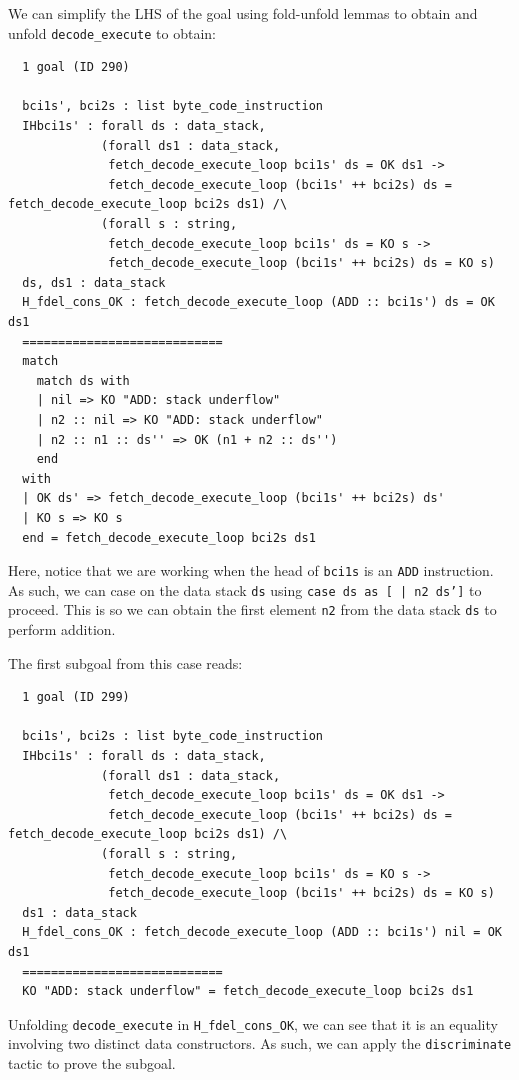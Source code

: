 \documentclass{article}
\begin{document}
We can simplify the LHS of the goal using fold-unfold lemmas to obtain and unfold \texttt{decode\_execute} to obtain:

\begin{lstlisting}
  1 goal (ID 290)
  
  bci1s', bci2s : list byte_code_instruction
  IHbci1s' : forall ds : data_stack,
             (forall ds1 : data_stack,
              fetch_decode_execute_loop bci1s' ds = OK ds1 ->
              fetch_decode_execute_loop (bci1s' ++ bci2s) ds = fetch_decode_execute_loop bci2s ds1) /\
             (forall s : string,
              fetch_decode_execute_loop bci1s' ds = KO s ->
              fetch_decode_execute_loop (bci1s' ++ bci2s) ds = KO s)
  ds, ds1 : data_stack
  H_fdel_cons_OK : fetch_decode_execute_loop (ADD :: bci1s') ds = OK ds1
  ============================
  match
    match ds with
    | nil => KO "ADD: stack underflow"
    | n2 :: nil => KO "ADD: stack underflow"
    | n2 :: n1 :: ds'' => OK (n1 + n2 :: ds'')
    end
  with
  | OK ds' => fetch_decode_execute_loop (bci1s' ++ bci2s) ds'
  | KO s => KO s
  end = fetch_decode_execute_loop bci2s ds1
\end{lstlisting}

Here, notice that we are working when the head of \texttt{bci1s} is an \texttt{ADD} instruction. As such, we can case on the data stack \texttt{ds} using \texttt{case ds as [ | n2 ds']} to proceed. This is so we can obtain the first element \texttt{n2} from the data stack \texttt{ds} to perform addition.

The first subgoal from this case reads:

\begin{lstlisting}
  1 goal (ID 299)
  
  bci1s', bci2s : list byte_code_instruction
  IHbci1s' : forall ds : data_stack,
             (forall ds1 : data_stack,
              fetch_decode_execute_loop bci1s' ds = OK ds1 ->
              fetch_decode_execute_loop (bci1s' ++ bci2s) ds = fetch_decode_execute_loop bci2s ds1) /\
             (forall s : string,
              fetch_decode_execute_loop bci1s' ds = KO s ->
              fetch_decode_execute_loop (bci1s' ++ bci2s) ds = KO s)
  ds1 : data_stack
  H_fdel_cons_OK : fetch_decode_execute_loop (ADD :: bci1s') nil = OK ds1
  ============================
  KO "ADD: stack underflow" = fetch_decode_execute_loop bci2s ds1
\end{lstlisting}

Unfolding \texttt{decode\_execute} in \texttt{H\_fdel\_cons\_OK}, we can see that it is an equality involving two distinct data constructors. As such, we can apply the \texttt{discriminate} tactic to prove the subgoal.
\end{document}
